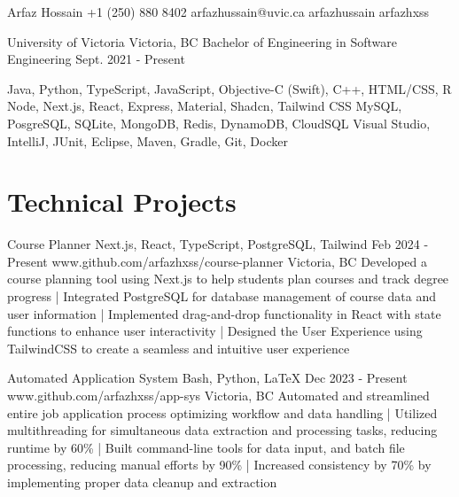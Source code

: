 \documentclass[a4paper,10pt]{article}
\begin{document}
\header
{Arfaz Hossain}				%
{+1 (250) 880 8402}			%
{arfazhussain@uvic.ca} 			%
{arfazhussain} 				%
{arfazhxss} 				%


\education
{University of Victoria}
{Victoria, BC}
{Bachelor of Engineering in Software Engineering}
{Sept. 2021 - Present}

\technicalskills
{Java, Python, TypeScript, JavaScript, Objective-C (Swift), C++, HTML/CSS, R}
{Node, Next.js, React, Express, Material, Shadcn, Tailwind CSS}
{MySQL, PosgreSQL, SQLite, MongoDB, Redis, DynamoDB, CloudSQL}
{Visual Studio, IntelliJ, JUnit, Eclipse, Maven, Gradle, Git, Docker}

\section{Technical Projects}
\projectentry
{Course Planner}
{Next.js, React, TypeScript, PostgreSQL, Tailwind}
{Feb 2024 - Present}
{www.github.com/arfazhxss/course-planner}
{Victoria, BC}
{Developed a course planning tool using Next.js to help students plan courses and track degree progress 
| Integrated PostgreSQL for database management of course data and user information 
| Implemented drag-and-drop functionality in React with state functions to enhance user interactivity 
| Designed the User Experience using TailwindCSS to create a seamless and intuitive user experience
}

\projectentry
{Automated Application System}
{Bash, Python, LaTeX}
{Dec 2023 - Present}
{www.github.com/arfazhxss/app-sys}
{Victoria, BC}
{Automated and streamlined entire job application process optimizing workflow and data handling
| Utilized multithreading for simultaneous data extraction and processing tasks, reducing runtime by 60\% 
| Built command-line tools for data input, and batch file processing, reducing manual efforts by 90\% 
| Increased consistency by 70\% by implementing proper data cleanup and extraction}
\end{document}
